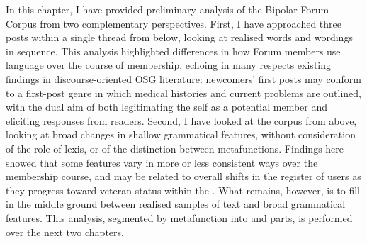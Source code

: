 In this chapter, I have provided preliminary analysis of the Bipolar Forum Corpus from two complementary perspectives. First, I have approached three \glspl{post} within a single \gls{thread} from below, looking at realised words and wordings in sequence. This analysis highlighted differences in how \gls{Forum} \glspl{member} use language over the course of membership, echoing in many respects existing findings in discourse\hyp{}oriented \gls{OSG} literature: newcomers' first \glspl{post} may conform to a first\hyp{}\gls{post} genre in which medical histories and current problems are outlined, with the dual aim of both legitimating the self as a potential member and eliciting responses from readers. Second, I have looked at the corpus from above, looking at broad changes in shallow grammatical features, without consideration of the role of lexis, or of the distinction between metafunctions. Findings here showed that some features vary in more or less consistent ways over the membership course, and may be related to overall shifts in the register of users as they progress toward veteran status within the . What remains, however, is to fill in the middle ground between realised samples of text and broad grammatical features. This analysis, segmented by metafunction into  and  parts, is performed over the next two chapters.
